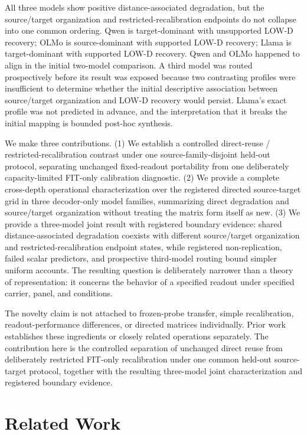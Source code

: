 \documentclass{article}
\begin{document}
All three models show positive distance-associated degradation, but the source/target organization and restricted-recalibration endpoints do not collapse into one common ordering. Qwen is target-dominant with unsupported LOW-D recovery; OLMo is source-dominant with supported LOW-D recovery; Llama is target-dominant with supported LOW-D recovery. Qwen and OLMo happened to align in the initial two-model comparison. A third model was routed prospectively before its result was exposed because two contrasting profiles were insufficient to determine whether the initial descriptive association between source/target organization and LOW-D recovery would persist. Llama's exact profile was not predicted in advance, and the interpretation that it breaks the initial mapping is bounded post-hoc synthesis.

We make three contributions. (1) We establish a controlled direct-reuse / restricted-recalibration contrast under one source-family-disjoint held-out protocol, separating unchanged fixed-readout portability from one deliberately capacity-limited FIT-only calibration diagnostic. (2) We provide a complete cross-depth operational characterization over the registered directed source-target grid in three decoder-only model families, summarizing direct degradation and source/target organization without treating the matrix form itself as new. (3) We provide a three-model joint result with registered boundary evidence: shared distance-associated degradation coexists with different source/target organization and restricted-recalibration endpoint states, while registered non-replication, failed scalar predictors, and prospective third-model routing bound simpler uniform accounts. The resulting question is deliberately narrower than a theory of representation: it concerns the behavior of a specified readout under specified carrier, panel, and conditions.

The novelty claim is not attached to frozen-probe transfer, simple recalibration, readout-performance differences, or directed matrices individually. Prior work establishes these ingredients or closely related operations separately. The contribution here is the controlled separation of unchanged direct reuse from deliberately restricted FIT-only recalibration under one common held-out source-target protocol, together with the resulting three-model joint characterization and registered boundary evidence.

\section{Related Work}
\end{document}
